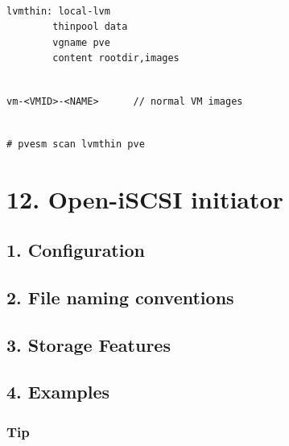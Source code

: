 \begin{lstlisting}

lvmthin: local-lvm
        thinpool data
        vgname pve
        content rootdir,images

\end{lstlisting}

\begin{lstlisting}

vm-<VMID>-<NAME>      // normal VM images

\end{lstlisting}

\begin{lstlisting}

# pvesm scan lvmthin pve

\end{lstlisting}

\begin{table}[htbp]

\centering

\begin{tabular}

\end{tabular}

\end{table}


\section{12. Open-iSCSI initiator}

\subsection{1. Configuration}

\subsection{2. File naming conventions}

\subsection{3. Storage Features}

\subsection{4. Examples}

\subsubsection{Tip}

